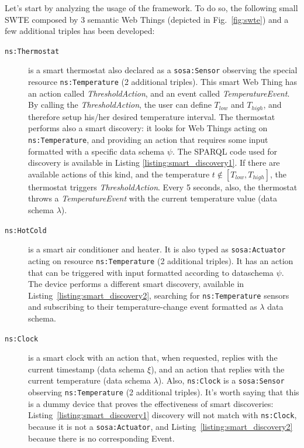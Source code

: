 Let's start by analyzing the usage of the framework. To do so, the following small SWTE composed by 3 semantic Web Things (depicted in Fig.~\ref{fig:swte}) and a few additional triples has been developed:
\begin{description}
    \item[\texttt{ns:Thermostat}] is a smart thermostat also declared as a \texttt{sosa:Sensor} observing the special resource \texttt{ns:Temperature} (2 additional triples). This smart Web Thing has an action called \textit{ThresholdAction}, and an event called \textit{TemperatureEvent}. By calling the \textit{ThresholdAction}, the user can define $T_{low}$ and $T_{high}$, and therefore setup his/her desired temperature interval. The thermostat performs also a smart discovery: it looks for Web Things acting on \texttt{ns:Temperature}, and providing an action that requires some input formatted with a specific data schema $\psi$. The SPARQL code used for discovery is available in Listing \ref{listing:smart_discovery1}. If there are available actions of this kind, and the temperature $t\not\in [T_{low},T_{high}]$, the thermostat triggers \textit{ThresholdAction}. Every 5 seconds, also, the thermostat throws a \textit{TemperatureEvent} with the current temperature value (data schema $\lambda$).
    \item[\texttt{ns:HotCold}] is a smart air conditioner and heater. It is also typed as \texttt{sosa:Actuator} acting on resource \texttt{ns:Temperature} (2 additional triples). It has an action that can be triggered with input formatted according to dataschema $\psi$. The device performs a different smart discovery, available in Listing~\ref{listing:smart_discovery2}, searching for \texttt{ns:Temperature} sensors and subscribing to their temperature-change event formatted as $\lambda$ data schema. 
        \item[\texttt{ns:Clock}] is a smart clock with an action that, when requested, replies with the current timestamp (data schema $\xi$), and an action that replies with the current temperature (data schema $\lambda$). Also, \texttt{ns:Clock} is a \texttt{sosa:Sensor} observing \texttt{ns:Temperature} (2 additional triples). It's worth saying that this is a dummy device that proves the effectiveness of smart discoveries: Listing~\ref{listing:smart_discovery1} discovery will not match with \texttt{ns:Clock}, because it is not a \texttt{sosa:Actuator}, and Listing~\ref{listing:smart_discovery2} because there is no corresponding Event.
    
    

\end{description}

